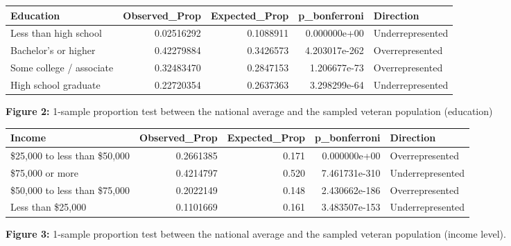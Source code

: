 \documentclass[
  10pt,
  letterpaper,
  DIV=11,
  numbers=noendperiod]{scrartcl}
\begin{document}
\begin{table}[h]
\centering
\renewcommand{\arraystretch}{0.8}
\begin{tabular}{lrrrl}
\toprule
Education & Observed\_Prop & Expected\_Prop & p\_bonferroni & Direction \\
\midrule
Less than high school & 0.02516292 & 0.1088911 & 0.000000e+00 & Underrepresented \\
Bachelor's or higher & 0.42279884 & 0.3426573 & 4.203017e-262 & Overrepresented \\
Some college / associate & 0.32483470 & 0.2847153 & 1.206677e-73 & Overrepresented \\
High school graduate & 0.22720354 & 0.2637363 & 3.298299e-64 & Underrepresented \\
\bottomrule
\end{tabular}
\end{table}

\begin{center}

\textbf{Figure 2:} 1-sample proportion test between the national average and the sampled veteran population (education)

\end{center}

\begin{table}[h]
\centering
\renewcommand{\arraystretch}{0.8}
\begin{tabular}{lrrrl}
\toprule
Income & Observed\_Prop & Expected\_Prop & p\_bonferroni & Direction \\
\midrule
\$25,000 to less than \$50,000 & 0.2661385 & 0.171 & 0.000000e+00 & Overrepresented \\
\$75,000 or more & 0.4214797 & 0.520 & 7.461731e-310 & Underrepresented \\
\$50,000 to less than \$75,000 & 0.2022149 & 0.148 & 2.430662e-186 & Overrepresented \\
Less than \$25,000 & 0.1101669 & 0.161 & 3.483507e-153 & Underrepresented \\
\bottomrule
\end{tabular}
\end{table}

\begin{center}

\textbf{Figure 3:} 1-sample proportion test between the national average and the sampled veteran population (income level).

\end{center}
\end{document}
